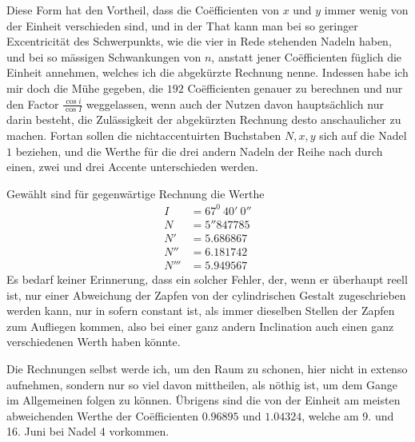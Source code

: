 Diese Form hat den Vortheil, dass die Coëfficienten von $x$ und $y$ immer wenig von der Einheit verschieden sind, und in der That kann man bei so geringer Excentricität des Schwerpunkts, wie die vier in Rede stehenden Nadeln haben, und bei so mässigen Schwankungen von $n$, anstatt jener Coëfficienten füglich die Einheit annehmen, welches ich die abgekürzte Rechnung nenne. Indessen habe ich mir doch die Mühe gegeben, die $192$ Coëfficienten genauer zu berechnen und nur den Factor $\frac{\cos i}{\cos I}$ weggelassen, wenn auch der Nutzen davon hauptsächlich nur darin besteht, die Zulässigkeit der abgekürzten Rechnung desto anschaulicher zu machen. Fortan sollen die nichtaccentuirten Buchstaben $N,x,y$ sich auf die Nadel $1$ beziehen, und die Werthe für die drei andern Nadeln der Reihe nach durch einen, zwei und drei Accente unterschieden werden.
\par\noindent Gewählt sind für gegenwärtige Rechnung die Werthe
\[
\begin{aligned}
I&=67^0\ 40'\ 0''\\
N&=5''847785\\
N'&=5.686867\\
N''&=6.181742\\
N'''&=5.949567
\end{aligned}
\]
\expandafter\def\csname HistoricalNoteText485\endcsname{Es bedarf keiner Erinnerung, dass ein solcher Fehler, der, wenn er überhaupt reell ist, nur einer Abweichung der Zapfen von der cylindrischen Gestalt zugeschrieben werden kann, nur in sofern constant ist, als immer dieselben Stellen der Zapfen zum Aufliegen kommen, also bei einer ganz andern Inclination auch einen ganz verschiedenen Werth haben könnte.}
\par\clearpage
{}
\noindent Die Rechnungen selbst werde ich, um den Raum zu schonen, hier nicht in extenso aufnehmen, sondern nur so viel davon mittheilen, als nöthig ist, um dem Gange im Allgemeinen folgen zu können. Übrigens sind die von der Einheit am meisten abweichenden Werthe der Coëfficienten $0.96895$ und $1.04324$, welche am 9. und 16. Juni bei Nadel 4 vorkommen.


